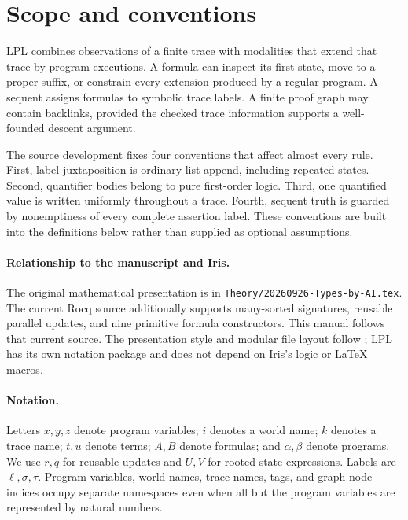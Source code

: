 \section{Scope and conventions}\label{sec:overview}

LPL combines observations of a finite trace with modalities that extend that
trace by program executions. A formula can inspect its first state, move to
a proper suffix, or constrain every extension produced by a regular program.
A sequent assigns formulas to symbolic trace labels. A finite proof graph
may contain backlinks, provided the checked trace information supports a
well-founded descent argument.

The source development fixes four conventions that affect almost every rule.
First, label juxtaposition is ordinary list append, including repeated states.
Second, quantifier bodies belong to pure first-order logic. Third, one
quantified value is written uniformly throughout a trace. Fourth, sequent
truth is guarded by nonemptiness of every complete assertion label.
These conventions are built into the definitions below rather than supplied
as optional assumptions.

\paragraph{Relationship to the manuscript and Iris.}
The original mathematical presentation is in
\nolinkurl{Theory/20260926-Types-by-AI.tex}. The current Rocq source additionally supports
many-sorted signatures, reusable parallel updates, and nine primitive formula
constructors. This manual follows that current source. The presentation style
and modular file layout follow ; LPL has its own notation package
and does not depend on Iris's logic or LaTeX macros.

\paragraph{Notation.}
Letters $x,y,z$ denote program variables; $i$ denotes a world name; $k$ denotes
a trace name; $t,u$ denote terms; $A,B$ denote formulas; and $\alpha,\beta$ denote
programs. We use $r,q$ for reusable updates and $U,V$ for rooted state
expressions. Labels are $\ell,\sigma,\tau$. Program variables, world names,
trace names, tags, and graph-node indices occupy separate namespaces even
when all but the program variables are represented by natural numbers.

